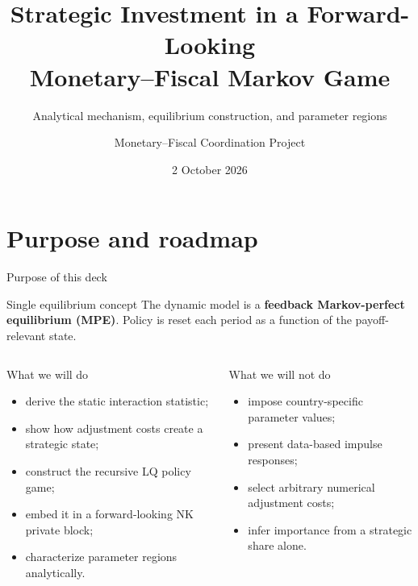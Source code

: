 \documentclass[10pt,aspectratio=169]{beamer}
\title{Strategic Investment in a Forward-Looking\\Monetary--Fiscal Markov Game}
\subtitle{Analytical mechanism, equilibrium construction, and parameter regions}
\author{Monetary--Fiscal Coordination Project}
\date{2 October 2026}
\begin{document}
\begin{frame}[plain]
\vspace{0.8cm}
\hspace{0.18\textwidth}
\begin{minipage}{0.78\textwidth}
  \maketitle
\end{minipage}
\end{frame}

\section{Purpose and roadmap}

\begin{frame}{Purpose of this deck}
\begin{alertblock}{Single equilibrium concept}
The dynamic model is a \textbf{feedback Markov-perfect equilibrium (MPE)}.
Policy is reset each period as a function of the payoff-relevant state.
\end{alertblock}
\begin{columns}[T,onlytextwidth]
\begin{block}{What we will do}
\begin{itemize}
  \item derive the static interaction statistic;
  \item show how adjustment costs create a strategic state;
  \item construct the recursive LQ policy game;
  \item embed it in a forward-looking NK private block;
  \item characterize parameter regions analytically.
\end{itemize}
\end{block}
\begin{exampleblock}{What we will not do}
\begin{itemize}
  \item impose country-specific parameter values;
  \item present data-based impulse responses;
  \item select arbitrary numerical adjustment costs;
  \item infer importance from a strategic share alone.
\end{itemize}
\end{exampleblock}
\end{columns}
\end{frame}
\end{document}

